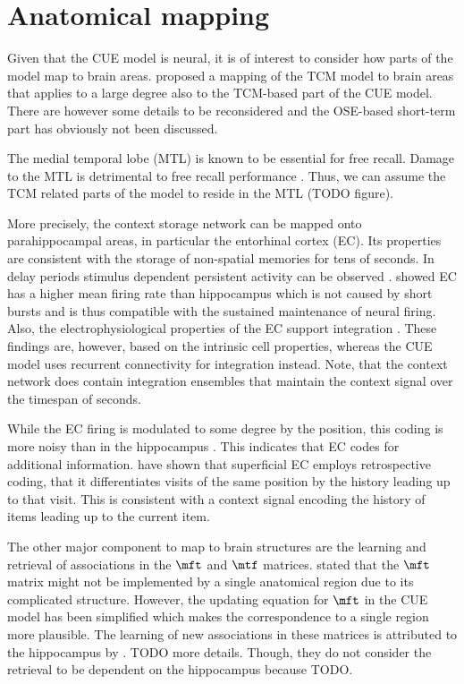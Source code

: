 \section{Anatomical mapping}

Given that the CUE model is neural, it is of interest to consider how parts of the model map to brain areas.
\Textcite{howard2005} proposed a mapping of the TCM model to brain areas that applies to a large degree also to the TCM-based part of the CUE model.
There are however some details to be reconsidered and the OSE-based short-term part has obviously not been discussed.

The medial temporal lobe (MTL) is known to be essential for free recall.
Damage to the MTL is detrimental to free recall performance \parencite{graf1984}.
Thus, we can assume the TCM related parts of the model to reside in the MTL (TODO figure).

More precisely, the context storage network can be mapped  onto parahippocampal areas, in particular the entorhinal cortex (EC).
Its properties are consistent with the storage of non-spatial memories for tens of seconds.
In delay periods stimulus dependent persistent activity can be observed \parencite{suzuki1997-1,young1997}.
\Textcite{quirk1992} showed EC has a higher mean firing rate than hippocampus which is not caused by short bursts and is thus compatible with the sustained maintenance of neural firing.
Also, the electrophysiological properties of the EC support integration \parencite{egorov2002}.
These findings are, however, based on the intrinsic cell properties, whereas the CUE model uses recurrent connectivity for integration instead.
Note, that the context network does contain integration ensembles that maintain the context signal over the timespan of seconds.

While the EC firing is modulated to some degree by the position, this coding is more noisy than in the hippocampus \parencite{quirk1992}.
This indicates that EC codes for additional information.
\Textcite{Frank2000} have shown that superficial EC employs retrospective coding, that it differentiates visits of the same position by the history leading up to that visit.
This is consistent with a context signal encoding the history of items leading up to the current item.

The other major component to map to brain structures are the learning and retrieval of associations in the $\mft$ and $\mtf$ matrices.
\Textcite{howard2005} stated that the $\mft$ matrix might not be implemented by a single anatomical region due to its complicated structure.
However, the updating equation for $\mft$ in the CUE model has been simplified which makes the correspondence to a single region more plausible.
The learning of new associations in these matrices is attributed to the hippocampus by \textcite{howard2005}.
TODO more details.
Though, they do not consider the retrieval to be dependent on the hippocampus because TODO\@.

